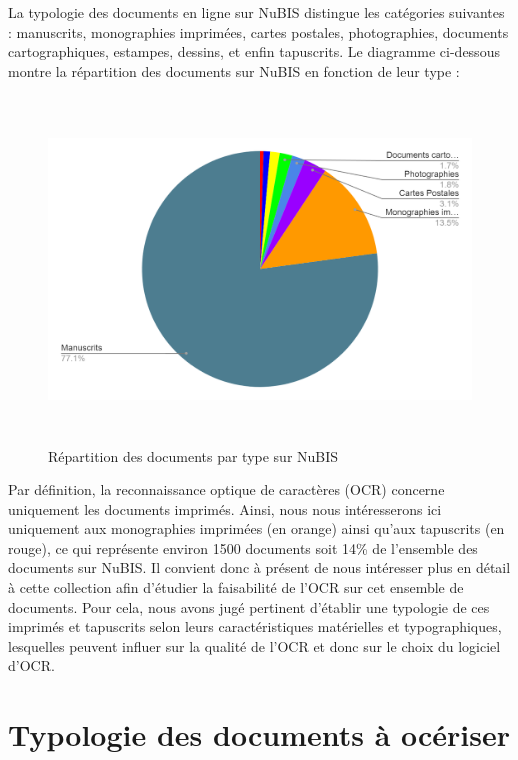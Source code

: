 \documentclass[a4paper,12pt,twoside]{book}
\begin{document}
La typologie des documents en ligne sur NuBIS distingue les catégories
suivantes : manuscrits, monographies imprimées, cartes postales,
photographies, documents cartographiques, estampes, dessins, et enfin
tapuscrits. Le diagramme ci-dessous montre la répartition des documents
sur NuBIS en fonction de leur type : \\

\begin{figure} [H]
	\includegraphics[width=5.83194in,height=3.60972in]{vertopal_157ae480aa4a4b07be198b586a812241/media/image2.png}
	\caption{Répartition des documents par type sur NuBIS}
\end{figure}

Par définition, la reconnaissance optique de caractères (OCR) concerne
uniquement les documents imprimés. Ainsi, nous nous intéresserons ici
uniquement aux monographies imprimées (en orange) ainsi qu'aux
tapuscrits (en rouge), ce qui représente environ 1500 documents soit
14\% de l'ensemble des documents sur NuBIS. Il convient donc à présent
de nous intéresser plus en détail à cette collection afin d'étudier la
faisabilité de l'OCR sur cet ensemble de documents. Pour cela, nous
avons jugé pertinent d'établir une typologie de ces imprimés et
tapuscrits selon leurs caractéristiques matérielles et typographiques,
lesquelles peuvent influer sur la qualité de l'OCR et donc sur le choix
du logiciel d'OCR. 

\section{Typologie des documents à océriser}
\end{document}
